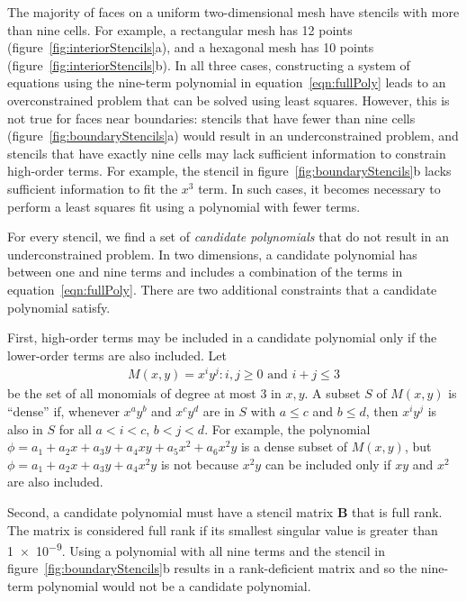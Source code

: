 The majority of faces on a uniform two-dimensional mesh have stencils with more than nine cells.  For example, a rectangular mesh has 12 points (figure~\ref{fig:interiorStencils}a), and a hexagonal mesh has 10 points (figure~\ref{fig:interiorStencils}b).
In all three cases, constructing a system of equations using the nine-term polynomial in equation~\eqref{eqn:fullPoly} leads to an overconstrained problem that can be solved using least squares.  However, this is not true for faces near boundaries: stencils that have fewer than nine cells (figure~\ref{fig:boundaryStencils}a) would result in an underconstrained problem, and stencils that have exactly nine cells may lack sufficient information to constrain high-order terms.  For example, the stencil in figure~\ref{fig:boundaryStencils}b lacks sufficient information to fit the $x^3$ term.  In such cases, it becomes necessary to perform a least squares fit using a polynomial with fewer terms.

For every stencil, we find a set of \textit{candidate polynomials} that do not result in an underconstrained problem.  In two dimensions, a candidate polynomial has between one and nine terms and includes a combination of the terms in equation~\eqref{eqn:fullPoly}.  There are two additional constraints that a candidate polynomial satisfy.

First, high-order terms may be included in a candidate polynomial only if the lower-order terms are also included.
Let
\begin{align}
	M(x, y) = { x^i y^j : i,j \geq 0 \text{ and } i+j \leq 3 }
\end{align}
be the set of all monomials of degree at most \num{3} in $x, y$.
A subset $S$ of $M(x,y)$ is ``dense'' if, whenever $x^a y^b$ and $x^c y^d$ are in $S$ with $a \leq c$ and $b \leq d$, then $x^i y^j$ is also in $S$ for all $a < i < c$, $b < j < d$.
For example, the polynomial $\phi = a_1 + a_2 x + a_3 y + a_4 xy + a_5 x^2 + a_6 x^2 y$ is a dense subset of $M(x,y)$, but $\phi = a_1 + a_2 x + a_3 y + a_4 x^2 y$ is not because $x^2 y$ can be included only if $xy$ and $x^2$ are also included.

Second, a candidate polynomial must have a stencil matrix $\mathbf{B}$ that is full rank.  The matrix is considered full rank if its smallest singular value is greater than \num{1e-9}.  Using a polynomial with all nine terms and the stencil in figure~\ref{fig:boundaryStencils}b results in a rank-deficient matrix and so the nine-term polynomial would not be a candidate polynomial.

